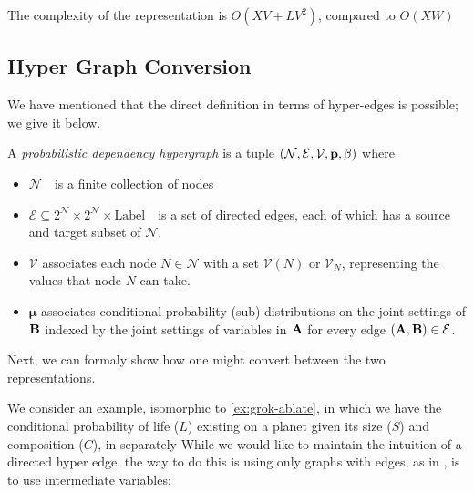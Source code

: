 \documentclass{article}
\theoremstyle{plain}
\theoremstyle{definition}
\newenvironment{example}
	{\pushQED{\qed}\renewcommand{\qedsymbol}{$\triangle$}\examplex}
	{\popQED\endexamplex%
}
\theoremstyle{remark}
\newcommand{\note}[1]{{\color{blue}\ \!\Large\smash{\textbf{[}}{\normalsize\textsc{note:} #1}\ \!\smash{\textbf{]}}}}
\newcommand{\bmu}{\boldsymbol{\mu}}
\newcommand{\V}{\mathcal V}
\newcommand{\N}{\mathcal N}
\newcommand{\Ed}{\mathcal E}
\newcommand{\modelnamehyper}{probabilistic dependency hypergraph}
\newcommand{\MNH}{PDH}
\numberwithin{equation}{section}
\begin{document}
{{	
	The complexity of the representation is $O(XV + L V^2)$, compared to $O(XW)$}
	
	\subsection{Hyper Graph Conversion}\label{sec:hyper-convert}
	We have mentioned that the direct definition in terms of hyper-edges is possible; we give it below.
	
	\begin{defn}[\MNH]\label{def:hypermodel}
		A \emph{\modelnamehyper} is a tuple $\mnvars[]$ where
		\begin{itemize}[nosep]
			\item $\N$~~is a finite collection of nodes
			\item $\Ed \subseteq 2^{\N} \times 2^{\N} \times \mathrm{Label}$~~is a set of directed edges, each of which has a source and target subset of $\N$.
			\item $\V$ associates each node $N \in \mathcal N$ with a set $\V(N)$ or $\V_N$, representing the values that node $N$ can take.
			\item $\bmu$
			associates conditional probability (sub)-distributions on the joint settings of $\bf B$ indexed by the joint settings of variables in $\bf A$ for every edge $({\bf A,B}) \in \Ed$. %
		\end{itemize}
	\end{defn}
	
	Next, we can formaly show how one might convert between the two representations.
		
	\begin{example}%
		We consider an example, isomorphic to \ref{ex:grok-ablate}, in which we have the conditional probability of life ($L$) existing on a planet given its size ($S$) and composition ($C$), in separately 
		While we would like to maintain the intuition of a directed hyper edge, the way to do this is using only graphs with edges, as in , is to use intermediate variables:
		

\end{example}}
\end{document}
